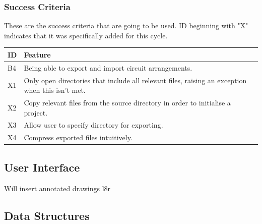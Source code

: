 \documentclass[11pt]{article}
\begin{document}
            \subsubsection{Success Criteria}
                These are the success criteria that are going to be used. ID beginning with "X" indicates that it was specifically added for this cycle.
                \begin{table}[!ht]
                    \begin{center}
                    \begin{tabular}{m{16pt}m{}}
                    ID & Feature \\ \hline
                    B4 & Being able to export and import circuit arrangements. \\ 
                    X1 & Only open directories that include all relevant files, raising an exception when this isn't met. \\ 
                    X2 & Copy relevant files from the source directory in order to initialise a project. \\ 
                    X3 & Allow user to specify directory for exporting. \\ 
                    X4 & Compress exported files intuitively. \\ 
                    \end{tabular}
                \end{center}
                    
                \end{table}
        \subsection{User Interface}

                Will insert annotated drawings l8r
        \subsection{Data Structures}
\end{document}
